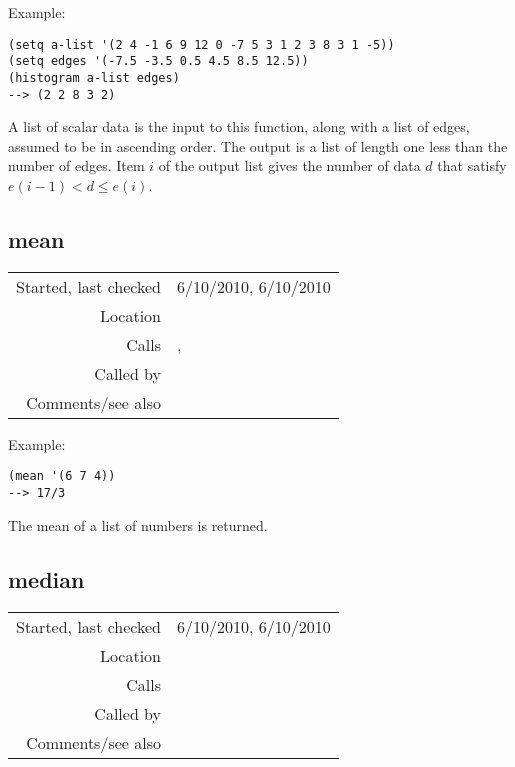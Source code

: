 \vspace{0.5cm}
\noindent Example:
\begin{verbatim}
(setq a-list '(2 4 -1 6 9 12 0 -7 5 3 1 2 3 8 3 1 -5))
(setq edges '(-7.5 -3.5 0.5 4.5 8.5 12.5))
(histogram a-list edges)
--> (2 2 8 3 2)
\end{verbatim}

\noindent A list of scalar data is the input to this
function, along with a list of edges, assumed to be in
ascending order. The output is a list of length one
less than the number of edges. Item $i$ of the output
list gives the number of data $d$ that satisfy
$e(i-1) < d \leq e(i)$.


\subsection*{mean}\label{fun:mean}

\vspace{0.3cm}
\begin{tabular}{r|p{8cm}}
Started, last checked & 6/10/2010, 6/10/2010 \\
Location & \nameref{sec:stats-sampling} \\
Calls & \nameref{fun:fibonacci-list}, \nameref{fun:my-last} \\
Called by & \nameref{fun:median} \\
Comments/see also & 
\end{tabular}

\vspace{0.5cm}
\noindent Example:
\begin{verbatim}
(mean '(6 7 4))
--> 17/3
\end{verbatim}

\noindent The mean of a list of numbers is
returned.


\subsection*{median}\label{fun:median}

\vspace{0.3cm}
\begin{tabular}{r|p{8cm}}
Started, last checked & 6/10/2010, 6/10/2010 \\
Location & \nameref{sec:stats-sampling} \\
Calls & \nameref{fun:mean} \\
Called by & \nameref{fun:quartiles} \\
Comments/see also & 
\end{tabular}

